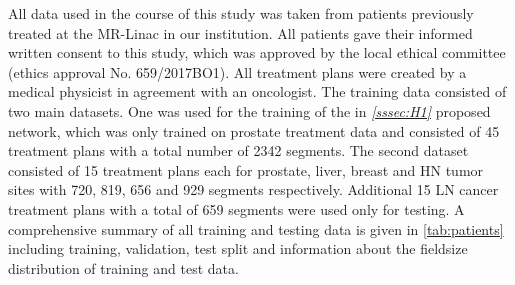 All data used in the course of this study was taken from patients previously treated at the MR-Linac in our institution. 
All patients gave their informed written consent to this study, which was approved by the local ethical committee (ethics approval No. 659/2017BO1).
All treatment plans were created by a medical physicist in agreement with an oncologist. 
The training data consisted of two main datasets. 
One was used for the training of the in \emph{\ref{sssec:H1} } proposed network, which was only trained on prostate treatment data and consisted of 45 treatment plans with a total number of 2342 segments. 
The second dataset consisted of 15 treatment plans each for prostate, liver, breast and \acs{HN} tumor sites with 720, 819, 656 and 929 segments respectively. 
Additional 15 \acs{LN} cancer treatment plans with a total of 659 segments were used only for testing. 
A comprehensive summary of all training and testing data is given in \autoref{tab:patients} including training, validation, test split and information about the fieldsize distribution of training and test data. 


